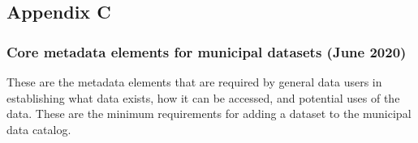 \documentclass[
]{book}
\begin{document}
\hypertarget{appendix-c-1}{%
\subsection*{Appendix C}\label{appendix-c-1}}

\hypertarget{core-metadata-elements-for-municipal-datasets-june-2020}{%
\subsubsection*{Core metadata elements for municipal datasets (June 2020)}\label{core-metadata-elements-for-municipal-datasets-june-2020}}

These are the metadata elements that are required by general data users in establishing what data exists, how it can be accessed, and potential uses of the data. These are the minimum requirements for adding a dataset to the municipal data catalog.
\end{document}
